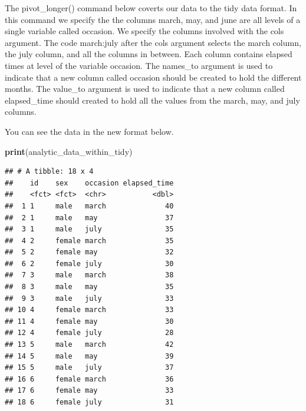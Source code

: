 \documentclass[
]{krantz}
\makeatletter
\newenvironment{Shaded}{\begin{snugshade}}{\end{snugshade}}
\newcommand{\DataTypeTok}[1]{\textcolor[rgb]{0.27,0.27,0.27}{#1}}
\newcommand{\KeywordTok}[1]{\textcolor[rgb]{0.27,0.27,0.27}{\textbf{#1}}}
\newcommand{\NormalTok}[1]{#1}
\newcommand{\OperatorTok}[1]{\textcolor[rgb]{0.43,0.43,0.43}{\textbf{#1}}}
\newcommand{\StringTok}[1]{\textcolor[rgb]{0.5,0.5,0.5}{#1}}
\newenvironment{kframe}{%
\medskip{}
\setlength{\fboxsep}{.8em}
 \def\at@end@of@kframe{}%
 \ifinner\ifhmode%
  \def\at@end@of@kframe{\end{minipage}}%
  \begin{minipage}{\columnwidth}%
 \fi\fi%
 \def\FrameCommand##1{\hskip\@totalleftmargin \hskip-\fboxsep
 \colorbox{shadecolor}{##1}\hskip-\fboxsep
     \hskip-\linewidth \hskip-\@totalleftmargin \hskip\columnwidth}%
 \MakeFramed {\advance\hsize-\width
   \@totalleftmargin\z@ \linewidth\hsize
   \@setminipage}}%
 {\par\unskip\endMakeFramed%
 \at@end@of@kframe}
\renewenvironment{Shaded}{\begin{kframe}}{\end{kframe}}
\makeatother
\begin{document}
The pivot\_longer() command below coverts our data to the tidy data format. In this command we specify the the columns march, may, and june are all levels of a single variable called occasion. We specify the columns involved with the cols argument. The code march:july after the cols argument selects the march column, the july column, and all the columns in between. Each column contains elapsed times at level of the variable occasion. The names\_to argument is used to indicate that a new column called occasion should be created to hold the different months. The value\_to argument is used to indicate that a new column called elapsed\_time should created to hold all the values from the march, may, and july columns.

\begin{Shaded}
\end{Shaded}

You can see the data in the new format below.

\begin{Shaded}
\begin{Highlighting}[]
\KeywordTok{print}\NormalTok{(analytic_data_within_tidy)}
\end{Highlighting}
\end{Shaded}

\begin{verbatim}
## # A tibble: 18 x 4
##    id    sex    occasion elapsed_time
##    <fct> <fct>  <chr>           <dbl>
##  1 1     male   march              40
##  2 1     male   may                37
##  3 1     male   july               35
##  4 2     female march              35
##  5 2     female may                32
##  6 2     female july               30
##  7 3     male   march              38
##  8 3     male   may                35
##  9 3     male   july               33
## 10 4     female march              33
## 11 4     female may                30
## 12 4     female july               28
## 13 5     male   march              42
## 14 5     male   may                39
## 15 5     male   july               37
## 16 6     female march              36
## 17 6     female may                33
## 18 6     female july               31
\end{verbatim}
\end{document}
